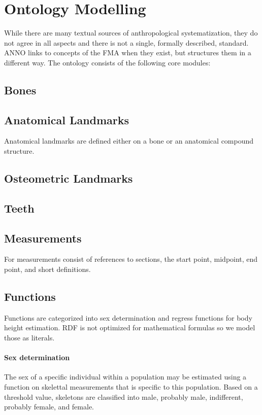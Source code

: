 \documentclass[sw]{iosart2x}
\begin{document}
\section{Ontology Modelling}
While there are many textual sources of anthropological systematization, they do not agree in all aspects and there is not a single, formally described, standard.
ANNO links to concepts of the FMA when they exist, but structures them in a different way.
The ontology consists of the following core modules:
\subsection{Bones}

\subsection{Anatomical Landmarks}
Anatomical landmarks are defined either on a bone or an anatomical compound structure.
\subsection{Osteometric Landmarks}

\subsection{Teeth}
\subsection{Measurements}
For measurements consist of references to sections, the start point, midpoint, end point, and short definitions.

\subsection{Functions}
Functions are categorized into sex determination and regress functions for body height estimation.
RDF is not optimized for mathematical formulas so we model those as literals.

\paragraph{Sex determination}
The sex of a specific individual within a population may be estimated using a function on skelettal measurements that is specific to this population.
Based on a threshold value, skeletons are classified into male, probably male, indifferent, probably female, and female.
\end{document}
